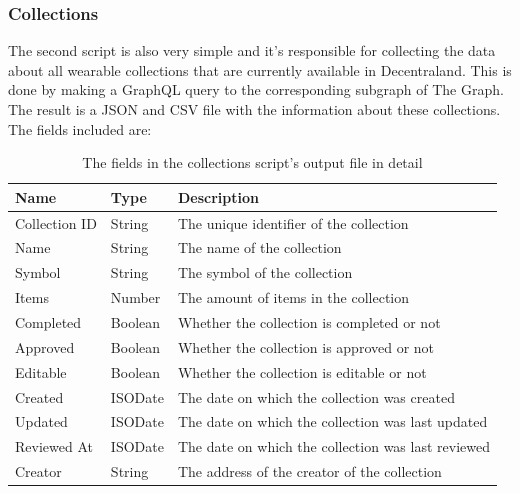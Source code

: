 \documentclass[MSE,Master,english]{twbook}%
\begin{document}
\subsubsection{Collections}
The second script is also very simple and it's responsible for collecting the data about all wearable collections that are currently available in Decentraland. This is done by making a GraphQL\cite{graphql} query to the corresponding subgraph of The Graph. The result is a JSON and CSV file with the information about these collections. \\

The fields included are:
\begin{table}[H]
  \centering
  \begin{tabularx}{\textwidth}{|l|l|X|}
  \hline
  \textbf{Name} & \textbf{Type} & \textbf{Description}                               \\ \hline
  Collection ID & String        & The unique identifier of the collection            \\ \hline
  Name          & String        & The name of the collection                         \\ \hline
  Symbol        & String        & The symbol of the collection                       \\ \hline
  Items         & Number        & The amount of items in the collection              \\ \hline
  Completed     & Boolean       & Whether the collection is completed or not         \\ \hline
  Approved      & Boolean       & Whether the collection is approved or not          \\ \hline
  Editable      & Boolean       & Whether the collection is editable or not          \\ \hline
  Created       & ISODate       & The date on which the collection was created       \\ \hline
  Updated       & ISODate       & The date on which the collection was last updated  \\ \hline
  Reviewed At   & ISODate       & The date on which the collection was last reviewed \\ \hline
  Creator       & String        & The address of the creator of the collection       \\ \hline
  \end{tabularx}
  \caption{The fields in the collections script's output file in detail}
  \label{table:collections}
  \end{table}
\end{document}
